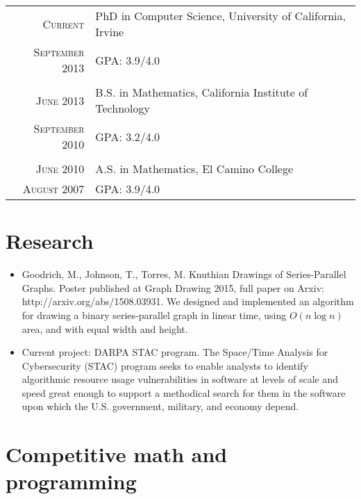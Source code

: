\documentclass[a4paper,10pt]{article} %
\begin{document}
\begin{tabular}{r|l}	
\textsc{Current} & PhD in Computer Science, University of California, Irvine\\
\textsc{September 2013} &\normalsize \textsc{GPA}: 3.9/4.0 \\
\multicolumn{2}{c}{} \\


\textsc{June 2013} & B.S. in Mathematics, California Institute of Technology \\
\textsc{September 2010} &\normalsize \textsc{GPA}: 3.2/4.0 \\
\multicolumn{2}{c}{} \\


\textsc{June 2010} & A.S. in Mathematics, El Camino College \\
\textsc{August 2007} & \textsc{GPA}: 3.9/4.0 \\

\end{tabular}

\section{Research}
\begin{itemize}
\item Goodrich, M., Johnson, T., Torres, M. Knuthian Drawings of Series-Parallel Graphs. Poster published at Graph Drawing 2015, full paper on Arxiv: http://arxiv.org/abs/1508.03931. \newline
We designed and implemented an algorithm for drawing a binary series-parallel graph in linear time, using $O(n \log n)$ area, and with equal width and height.

\item Current project: DARPA STAC program. The Space/Time Analysis for Cybersecurity (STAC) program seeks to enable analysts to identify algorithmic resource usage vulnerabilities in software at levels of scale and speed great enough to support a methodical search for them in the software upon which the U.S. government, military, and economy depend.
\end{itemize}

\section{Competitive math and programming}
\end{document}
